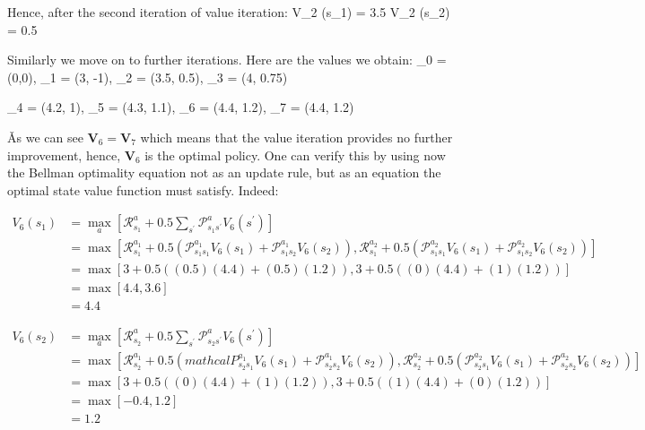 \vspace{-10pt}

Hence, after the second iteration of value iteration:
\bse
V_2 (s_1) = 3.5 \qquad V_2 (s_2) = 0.5
\ese

Similarly we move on to further iterations. Here are the values we obtain:
\bse
{}_0 = (0,0), \qquad {}_1 = (3, -1), \qquad {}_2 = (3.5, 0.5), \qquad
{}_3 = (4, 0.75)
\ese

\bse
{}_4 = (4.2, 1), \qquad {}_5 = (4.3, 1.1), \qquad {}_6 = (4.4, 1.2), \qquad
{}_7 = (4.4, 1.2)
\ese

\v

As we can see $\boldsymbol{V}_6 = \boldsymbol{V}_7$ which means that the value iteration provides no further
improvement, hence, $\boldsymbol{V}_6$ is the optimal policy. One can verify this by using now the Bellman optimality
equation not as an update rule, but as an equation the optimal state value function must satisfy. Indeed:

{\setlength{\jot}{10pt}
\begin{align*}
V_6 (s_1) & = \max_{a} \left[ \mathcal{R}_{s_1}^{a} +
0.5 \sum_{s^{\prime}} \mathcal{P}_{s_1 s^\prime}^{a} V_6 (s^\prime) \right] \\
& = \max \left[ \mathcal{R}_{s_1}^{a_1} + 0.5 \left( \mathcal{P}_{s_1 s_1}^{a_1} V_6 (s_1) +
\mathcal{P}_{s_1 s_2}^{a_1} V_6 (s_2) \right), \mathcal{R}_{s_1}^{a_2} +
0.5 \left(\mathcal{P}_{s_1 s_1}^{a_2} V_6 (s_1) + \mathcal{P}_{s_1 s_2}^{a_2} V_6 (s_2) \right) \right] \\
& = \max \left[ 3 + 0.5 \left( (0.5) (4.4) + (0.5) (1.2) \right), 3 + 0.5 \left( (0) (4.4) + (1) (1.2) \right) \right]
\\
& = \max \left[ 4.4, 3.6 \right] \\
& = 4.4
\end{align*}}

\vspace{-30pt}

{\setlength{\jot}{10pt}
\begin{align*}
V_6 (s_2) & = \max_{a} \left[ \mathcal{R}_{s_2}^{a} + 0.5 \sum_{s^{\prime}} \mathcal{P}_{s_2 s^\prime}^{a}
V_6 (s^\prime) \right] \\
& = \max \left[ \mathcal{R}_{s_2}^{a_1} +
0.5 \left(mathcal{P}_{s_2 s_1}^{a_1} V_6 (s_1) + \mathcal{P}_{s_2 s_2}^{a_1} V_6 (s_2) \right),
\mathcal{R}_{s_2}^{a_2} + 0.5 \left( \mathcal{P}_{s_2 s_1}^{a_2} V_6 (s_1) +
\mathcal{P}_{s_2 s_2}^{a_2} V_6 (s_2) \right) \right] \\
& = \max \left[ 3 + 0.5 \left( (0) (4.4) + (1) (1.2) \right), 3 + 0.5 \left( (1) (4.4) + (0) (1.2) \right) \right] \\
& = \max \left[ -0.4, 1.2 \right] \\
& = 1.2
\end{align*}}

